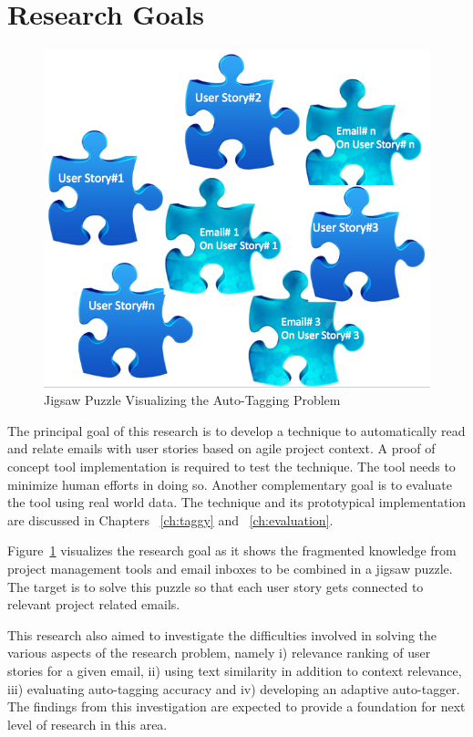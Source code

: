 \section{Research Goals}
\begin{figure}[bt]
	\centering
	\includegraphics[width=\textwidth]{Jigsaw.png}
    \caption{Jigsaw Puzzle Visualizing the Auto-Tagging Problem}
	\label{fig:jigsaw}
\end{figure}

The principal goal of this research is to develop a technique to automatically read and relate emails with user stories based on agile project context. A proof of concept tool implementation is required to test the technique. The tool needs to minimize human efforts in doing so. Another complementary goal is to evaluate the tool using real world data. The technique and its prototypical implementation are discussed in Chapters ~\ref{ch:taggy} and ~\ref{ch:evaluation}.

Figure~\ref{fig:jigsaw} visualizes the research goal as it shows the fragmented knowledge from project management tools and email inboxes to be combined in a jigsaw puzzle. The target is to solve this puzzle so that each user story gets connected to relevant project related emails.

This research also aimed to investigate the difficulties involved in solving the various aspects of the research problem, namely i) relevance ranking of user stories for a given email, ii) using text similarity in addition to context relevance, iii) evaluating auto-tagging accuracy and iv) developing an adaptive auto-tagger. The findings from this investigation are expected to provide a foundation for next level of research in this area.

